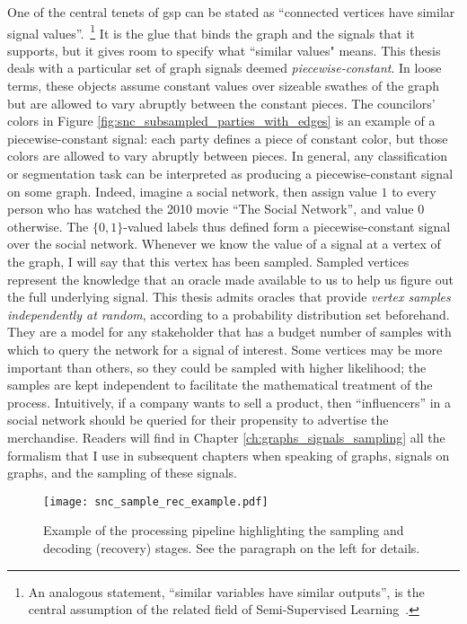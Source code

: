 One of the central tenets of \acrshort{gsp} can be stated as ``connected vertices have similar signal values''.~\footnote{An analogous statement, ``similar variables have similar outputs'', is the central assumption of the related field of Semi-Supervised Learning~\cite{chapelle2006}.} It is the glue that binds the graph and the signals that it supports, but it gives room to specify what ``similar values" means. This thesis deals with a particular set of graph signals deemed \emph{piecewise-constant}. In loose terms, these objects assume constant values over sizeable swathes of the graph but are allowed to vary abruptly between the constant pieces. The councilors' colors in Figure \ref{fig:snc_subsampled_parties_with_edges} is an example of a piecewise-constant signal: each party defines a piece of constant color, but those colors are allowed to vary abruptly between pieces. In general, any classification or segmentation task can be interpreted as producing a piecewise-constant signal on some graph. Indeed, imagine a social network, then assign value $1$ to every person who has watched the 2010 movie ``The Social Network'', and value $0$ otherwise. The $\{0,1\}$-valued labels thus defined form a piecewise-constant signal over the social network. Whenever we know the value of a signal at a vertex of the graph, I will say that this vertex has been sampled. Sampled vertices represent the knowledge that an oracle made available to us to help us figure out the full underlying signal. This thesis admits oracles that provide \emph{vertex samples independently at random}, according to a probability distribution set beforehand. They are a model for any stakeholder that has a budget number of samples with which to query the network for a signal of interest. Some vertices may be more important than others, so they could be sampled with higher likelihood; the samples are kept independent to facilitate the mathematical treatment of the process. Intuitively, if a company wants to sell a product, then ``influencers'' in a social network should be queried for their propensity to advertise the merchandise. Readers will find in Chapter \ref{ch:graphs_signals_sampling} all the formalism that I use in subsequent chapters when speaking of graphs, signals on graphs, and the sampling of these signals.

\begin{wrapfigure}{o}{0.35\textwidth}
    \centering
    \texttt{[image: snc\_sample\_rec\_example.pdf]}
    \caption[The processing pipeline highlighting the sampling and decoding stages]{Example of the processing pipeline highlighting the sampling and decoding (recovery) stages. See the paragraph on the left for details.}
    \label{fig:snc_sample_rec_example}
\end{wrapfigure}

